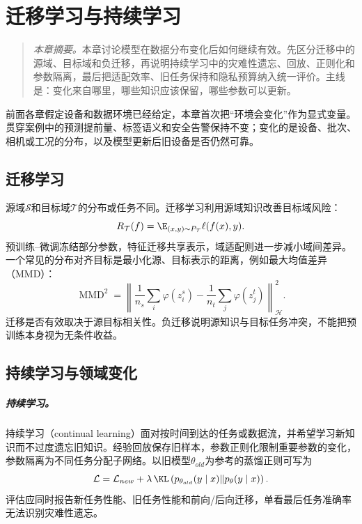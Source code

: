 \chapter{迁移学习与持续学习}
\begin{quote}\small
\textit{本章摘要。}本章讨论模型在数据分布变化后如何继续有效。先区分迁移中的源域、目标域和负迁移，再说明持续学习中的灾难性遗忘、回放、正则化和参数隔离，最后把适配效率、旧任务保持和隐私预算纳入统一评价。主线是：变化来自哪里，哪些知识应该保留，哪些参数可以更新。
\end{quote}
前面各章假定设备和数据环境已经给定，本章首次把“环境会变化”作为显式变量。贯穿案例中的预测提前量、标签语义和安全告警保持不变；变化的是设备、批次、相机或工况的分布，以及模型更新后旧设备是否仍然可靠。
\section{迁移学习}
源域$\mathcal{S}$和目标域$\mathcal{T}$的分布或任务不同。迁移学习利用源域知识改善目标域风险：
\begin{equation}
 R_{\mathcal{T}}(f)=\E_{(x,y)\sim P_\mathcal{T}}\ell(f(x),y).
\end{equation}
预训练--微调冻结部分参数，特征迁移共享表示，域适配则进一步减小域间差异。一个常见的分布对齐目标是最小化源、目标表示的距离，例如最大均值差异（MMD）：
\begin{equation}
 \operatorname{MMD}^2=\left\|\frac1{n_s}\sum_i\varphi(z_i^s)-\frac1{n_t}\sum_j\varphi(z_j^t)\right\|_{\mathcal{H}}^2.
\end{equation}
迁移是否有效取决于源目标相关性。负迁移说明源知识与目标任务冲突，不能把预训练本身视为无条件收益。

\section{持续学习与领域变化}
\paragraph{持续学习。}
持续学习（continual learning）面对按时间到达的任务或数据流，并希望学习新知识而不过度遗忘旧知识。经验回放保存旧样本，参数正则化限制重要参数的变化，参数隔离为不同任务分配子网络。以旧模型$\theta_{old}$为参考的蒸馏正则可写为
\begin{equation}
 \mathcal{L}=\mathcal{L}_{new}+\lambda\,\KL\left(p_{\theta_{old}}(y\mid x)\|p_\theta(y\mid x)\right).
\end{equation}
评估应同时报告新任务性能、旧任务性能和前向/后向迁移，单看最后任务准确率无法识别灾难性遗忘。

